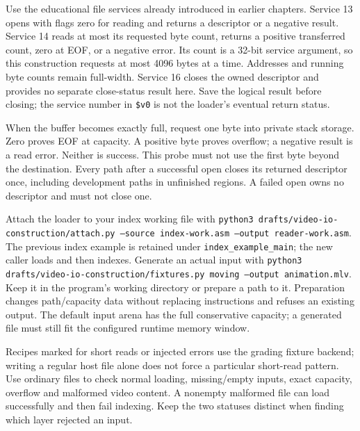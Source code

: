 Use the educational file services already introduced in earlier chapters.
Service 13 opens with flags zero for reading and returns a descriptor or a
negative result. Service 14 reads at most its requested byte count, returns a
positive transferred count, zero at EOF, or a negative error. Its count is a
32-bit service argument, so this construction requests at most 4096 bytes at a
time. Addresses and running byte counts remain full-width. Service 16 closes
the owned descriptor and provides no separate close-status result here. Save
the logical result before closing; the service number in \texttt{\$v0} is
not the loader's eventual return status.

When the buffer becomes exactly full, request one byte into private stack storage.
Zero proves EOF at capacity. A positive byte proves overflow; a negative result
is a read error. Neither is success. This probe must not use the first byte beyond
the destination. Every path after a successful open closes its returned descriptor
once, including development paths in unfinished regions. A failed open owns no
descriptor and must not close one.

Attach the loader to your index working file with
\texttt{python3 drafts/video-io-construction/attach.py --source index-work.asm
  --output reader-work.asm}. The previous index example is retained under
\texttt{index\_example\_main}; the new caller loads and then indexes. Generate
an actual input with \texttt{python3 drafts/video-io-construction/fixtures.py
  moving --output animation.mlv}. Keep it in the program's working directory or
prepare a path to it. Preparation changes path/capacity data without replacing
instructions and refuses an existing output. The default input arena has the
full conservative capacity; a generated file must still fit the configured
runtime memory window.

Recipes marked for short reads or injected errors use the grading fixture backend;
writing a regular host file alone does not force a particular short-read pattern.
Use ordinary files to check normal loading, missing/empty inputs, exact capacity,
overflow and malformed video content. A nonempty malformed file can load
successfully and then fail indexing. Keep the two statuses distinct when finding
which layer rejected an input.
